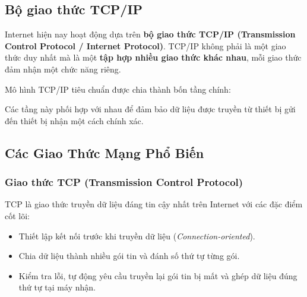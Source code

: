 \documentclass[11pt,oneside]{book}
\newcommand{\thd}[1]{\textcolor{white}{\textbf{\strut #1}}}
\newcommand{\term}[1]{\textbf{\textcolor{primaryBlue}{#1}}}
\begin{document}
\subsection{Bộ giao thức TCP/IP}

Internet hiện nay hoạt động dựa trên \term{bộ giao thức TCP/IP (Transmission Control Protocol / Internet Protocol)}. TCP/IP không phải là một giao thức duy nhất mà là một \textbf{tập hợp nhiều giao thức khác nhau}, mỗi giao thức đảm nhận một chức năng riêng.

Mô hình TCP/IP tiêu chuẩn được chia thành bốn tầng chính:

\begin{prettyTableBox}
\end{prettyTableBox}

Các tầng này phối hợp với nhau để đảm bảo dữ liệu được truyền từ thiết bị gửi đến thiết bị nhận một cách chính xác.

\subsection{Các Giao Thức Mạng Phổ Biến}

\subsubsection{Giao thức TCP (Transmission Control Protocol)}

TCP là giao thức truyền dữ liệu đáng tin cậy nhất trên Internet với các đặc điểm cốt lõi:
\begin{itemize}[leftmargin=1.8em, itemsep=2pt, parsep=0pt]
    \item Thiết lập kết nối trước khi truyền dữ liệu (\textit{Connection-oriented}).
    \item Chia dữ liệu thành nhiều gói tin và đánh số thứ tự từng gói.
    \item Kiểm tra lỗi, tự động yêu cầu truyền lại gói tin bị mất và ghép dữ liệu đúng thứ tự tại máy nhận.
\end{itemize}
\end{document}
